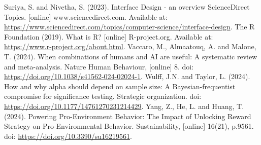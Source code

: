 \documentclass[
]{article}
\begin{document}
Suriya, S. and Nivetha, S. (2023). Interface Design - an overview
\textbar{} ScienceDirect Topics. {[}online{]} www.sciencedirect.com.
Available at:
\url{https://www.sciencedirect.com/topics/computer-science/interface-design}.
The R Foundation (2019). What is R? {[}online{]} R-project.org.
Available at: \url{https://www.r-project.org/about.html}. Vaccaro, M.,
Almaatouq, A. and Malone, T. (2024). When combinations of humans and AI
are useful: A systematic review and meta-analysis. Nature Human
Behaviour, {[}online{]} 8. doi:
\url{https://doi.org/10.1038/s41562-024-02024-1}. Wulff, J.N. and
Taylor, L. (2024). How and why alpha should depend on sample size: A
Bayesian-frequentist compromise for significance testing. Strategic
organization. doi: \url{https://doi.org/10.1177/14761270231214429}.
Yang, Z., He, L. and Huang, T. (2024). Powering Pro-Environment
Behavior: The Impact of Unlocking Reward Strategy on Pro-Environmental
Behavior. Sustainability, {[}online{]} 16(21), p.9561. doi:
\url{https://doi.org/10.3390/su16219561}.
\end{document}
